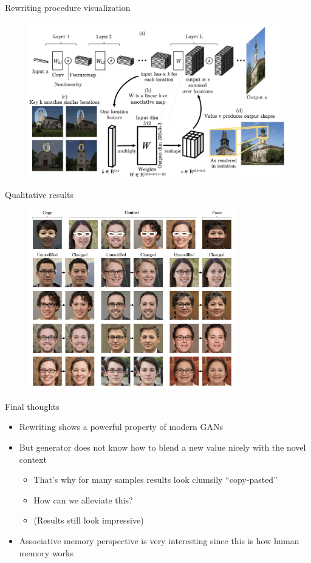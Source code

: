 \documentclass[handout, 10pt]{beamer}
\begin{document}
\begin{frame}{Rewriting procedure visualization}
\begin{figure}
\centering
\includegraphics[width=\textwidth]{images/rewriting-visualization.png}
\end{figure}
\end{frame}


\begin{frame}{Qualitative results}
\begin{figure}
\centering
\includegraphics[width=0.8\textwidth]{images/removing-eyeglasses}
\end{figure}
\end{frame}


\begin{frame}{Final thoughts}
\begin{itemize}
    \item Rewriting shows a powerful property of modern GANs
    \item But generator does not know how to blend a new value nicely with the novel context
    \begin{itemize}
        \item That's why for many samples results look clumsily ``copy-pasted''
        \item How can we alleviate this?
        \item (Results still look impressive)
    \end{itemize}
    \item Associative memory perspective is very interesting since this is how human memory works
\end{itemize}
\end{frame}
\end{document}
